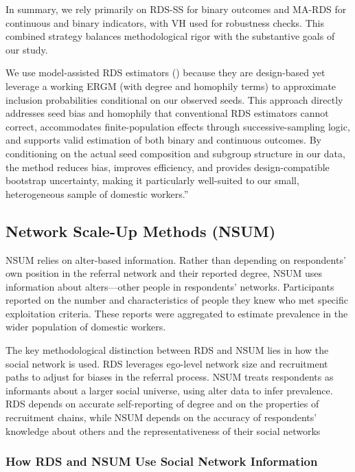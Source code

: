 \documentclass[
  12pt,
  letterpaper,
  DIV=11,
  numbers=noendperiod]{scrartcl}
\theoremstyle{plain}
\theoremstyle{definition}
\begin{document}
In summary, we rely primarily on RDS-SS for binary outcomes and MA-RDS
for continuous and binary indicators, with VH used for robustness
checks. This combined strategy balances methodological rigor with the
substantive goals of our study.

We use model-assisted RDS estimators (\textcite{gile15-network}) because
they are design-based yet leverage a working ERGM (with degree and
homophily terms) to approximate inclusion probabilities conditional on
our observed seeds. This approach directly addresses seed bias and
homophily that conventional RDS estimators cannot correct, accommodates
finite-population effects through successive-sampling logic, and
supports valid estimation of both binary and continuous outcomes. By
conditioning on the actual seed composition and subgroup structure in
our data, the method reduces bias, improves efficiency, and provides
design-compatible bootstrap uncertainty, making it particularly
well-suited to our small, heterogeneous sample of domestic workers.''

\subsection{Network Scale-Up Methods
(NSUM)}\label{network-scale-up-methods-nsum}

NSUM relies on alter-based information. Rather than depending on
respondents' own position in the referral network and their reported
degree, NSUM uses information about alters---other people in
respondents' networks. Participants reported on the number and
characteristics of people they knew who met specific exploitation
criteria. These reports were aggregated to estimate prevalence in the
wider population of domestic workers.

The key methodological distinction between RDS and NSUM lies in how the
social network is used. RDS leverages ego-level network size and
recruitment paths to adjust for biases in the referral process. NSUM
treats respondents as informants about a larger social universe, using
alter data to infer prevalence. RDS depends on accurate self-reporting
of degree and on the properties of recruitment chains, while NSUM
depends on the accuracy of respondents' knowledge about others and the
representativeness of their social networks

\subsubsection{How RDS and NSUM Use Social Network
Information}\label{how-rds-and-nsum-use-social-network-information}
\end{document}
